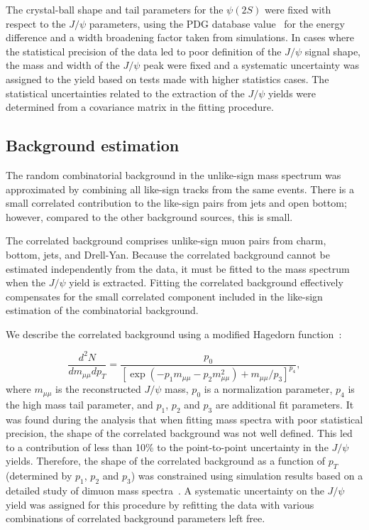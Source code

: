 \documentclass[twocolumn,letterpaper,aps,prc,longbibliography,superscriptaddress,nofootinbib,floatfix]{revtex4-1}
\newcommand{\pt}{\mbox{$p_T$}\xspace}
\newcommand{\jpsi}{\mbox{$J/\psi$}\xspace}
\begin{document}
The crystal-ball shape and tail parameters for the $\psi(2S)$ were fixed 
with respect to the \jpsi parameters, using the PDG database 
value~\cite{PDG} for the energy difference and a width broadening factor 
taken from simulations. In cases where the statistical precision of the 
data led to poor definition of the \jpsi signal shape, the mass and 
width of the \jpsi peak were fixed and a systematic uncertainty was 
assigned to the yield based on tests made with higher statistics cases.
The statistical uncertainties related to the extraction of the \jpsi 
yields were determined from a covariance matrix in the fitting 
procedure.

\subsection{Background estimation}
\label{sec:background}

The random combinatorial background in the unlike-sign mass spectrum was 
approximated by combining all like-sign tracks from the same events. 
There is a small correlated contribution to the like-sign pairs from 
jets and open bottom; however, compared to the other background sources, 
this is small.

The correlated background comprises unlike-sign muon pairs from charm, 
bottom, jets, and Drell-Yan. Because the correlated background cannot be 
estimated independently from the data, it must be fitted to the mass 
spectrum when the \jpsi yield is extracted. Fitting the correlated 
background effectively compensates for the small correlated component 
included in the like-sign estimation of the combinatorial background.

We describe the correlated background using a modified Hagedorn 
function~\cite{Adare:2010de, Aidala:2018ajl, Adare:2009qk}:

\begin{equation}
\label{eq:hagedorn}
   \frac{d^2N}{dm_{\mu\mu}d\pt} = \frac{p_{0}}{[\exp{(-p_{1}m_{\mu\mu} - 
p_{2}m_{\mu\mu}^2)} + {m_{\mu\mu}}/{p_{3}}]^{p_{4}}},
\end{equation}
where $m_{\mu \mu}$ is the reconstructed \jpsi mass, $p_0$ is a 
normalization parameter, $p_4$ is the high mass tail parameter, and 
$p_1$, $p_2$ and $p_3$ are additional fit parameters.  It was found 
during the analysis that when fitting mass spectra with poor statistical 
precision, the shape of the correlated background was not well defined. 
This led to a contribution of less than 10\% to the point-to-point 
uncertainty in the \jpsi yields. Therefore, the shape of the correlated 
background as a function of \pt (determined by $p_1$, $p_2$ and $p_3$) 
was constrained using simulation results based on a detailed study of 
dimuon mass spectra~\cite{Aidala:2018ajl, Leung:2019vbb, 
Aidala:2019cnn,Adare:2013lkk}. A systematic uncertainty on the \jpsi 
yield was assigned for this procedure by refitting the data with various 
combinations of correlated background parameters left free.
\end{document}
